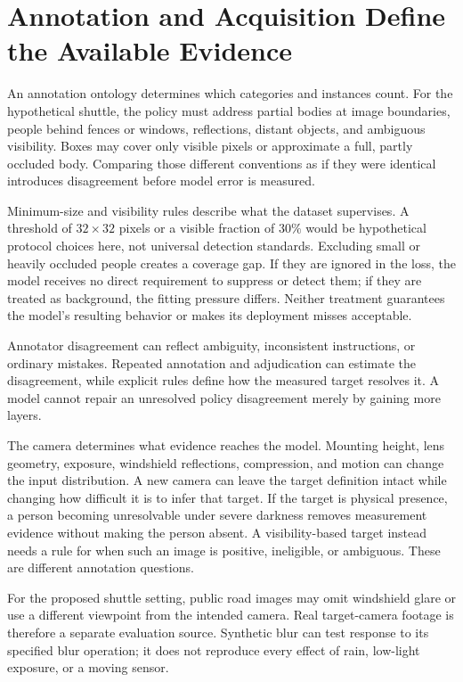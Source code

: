 \section{Annotation and Acquisition Define the Available Evidence}

An annotation ontology determines which categories and instances count. For the hypothetical shuttle, the policy must address partial bodies at image boundaries, people behind fences or windows, reflections, distant objects, and ambiguous visibility. Boxes may cover only visible pixels or approximate a full, partly occluded body. Comparing those different conventions as if they were identical introduces disagreement before model error is measured.

Minimum-size and visibility rules describe what the dataset supervises. A threshold of $32\times32$ pixels or a visible fraction of $30\%$ would be hypothetical protocol choices here, not universal detection standards. Excluding small or heavily occluded people creates a coverage gap. If they are ignored in the loss, the model receives no direct requirement to suppress or detect them; if they are treated as background, the fitting pressure differs. Neither treatment guarantees the model's resulting behavior or makes its deployment misses acceptable.

Annotator disagreement can reflect ambiguity, inconsistent instructions, or ordinary mistakes. Repeated annotation and adjudication can estimate the disagreement, while explicit rules define how the measured target resolves it. A model cannot repair an unresolved policy disagreement merely by gaining more layers.

The camera determines what evidence reaches the model. Mounting height, lens geometry, exposure, windshield reflections, compression, and motion can change the input distribution. A new camera can leave the target definition intact while changing how difficult it is to infer that target. If the target is physical presence, a person becoming unresolvable under severe darkness removes measurement evidence without making the person absent. A visibility-based target instead needs a rule for when such an image is positive, ineligible, or ambiguous. These are different annotation questions.

For the proposed shuttle setting, public road images may omit windshield glare or use a different viewpoint from the intended camera. Real target-camera footage is therefore a separate evaluation source. Synthetic blur can test response to its specified blur operation; it does not reproduce every effect of rain, low-light exposure, or a moving sensor.

